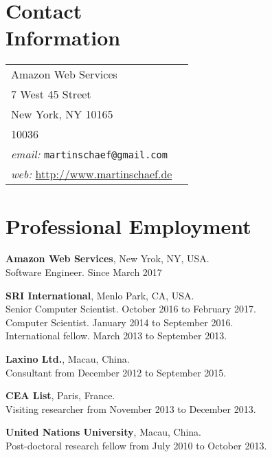 \documentclass[margin,line]{res}
\begin{document}

\begin{resume}
\section{\sc Contact\\ Information}

\begin{tabular}{@{}p{3in}p{4in}}
Amazon Web Services  & \\%
7 West 45 Street &\\
New York, NY 10165 & \\
10036 & \\
\emph{email:}  \texttt{martinschaef@gmail.com} & \\
\emph{web:} \url{http://www.martinschaef.de} & \\
\end{tabular}



%

\section{\sc Professional Employment}

\textbf{Amazon Web Services}, New Yrok, NY, USA.\\
 Software Engineer. Since March 2017

\textbf{SRI International}, Menlo Park, CA, USA.\\
 Senior Computer Scientist. October 2016 to February 2017. \\
 Computer Scientist. January 2014 to September 2016. \\
 International fellow. March 2013 to September 2013.

\textbf{Laxino Ltd.}, Macau, China.\\
Consultant from December 2012 to September 2015.

\textbf{CEA List}, Paris, France.\\
Visiting researcher from November 2013 to December 2013.

\textbf{United Nations University}, Macau, China.\\
Post-doctoral research fellow from July 2010 to October 2013.


\end{resume}
\end{document}
